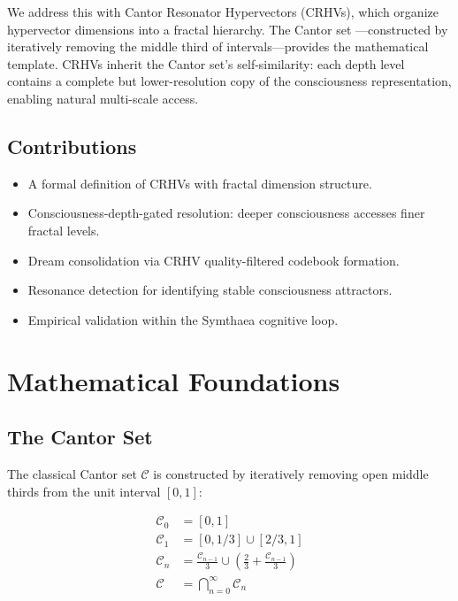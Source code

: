 \documentclass[11pt,a4paper]{article}
\begin{document}
We address this with Cantor Resonator Hypervectors (CRHVs), which organize hypervector dimensions into a fractal hierarchy. The Cantor set \citep{cantor1883}---constructed by iteratively removing the middle third of intervals---provides the mathematical template. CRHVs inherit the Cantor set's self-similarity: each depth level contains a complete but lower-resolution copy of the consciousness representation, enabling natural multi-scale access.

\subsection{Contributions}

\begin{itemize}[nosep]
    \item A formal definition of CRHVs with fractal dimension structure.
    \item Consciousness-depth-gated resolution: deeper consciousness accesses finer fractal levels.
    \item Dream consolidation via CRHV quality-filtered codebook formation.
    \item Resonance detection for identifying stable consciousness attractors.
    \item Empirical validation within the Symthaea cognitive loop.
\end{itemize}

\section{Mathematical Foundations}

\subsection{The Cantor Set}

The classical Cantor set $\mathcal{C}$ is constructed by iteratively removing open middle thirds from the unit interval $[0,1]$:

\begin{align}
\mathcal{C}_0 &= [0, 1] \\
\mathcal{C}_1 &= [0, 1/3] \cup [2/3, 1] \\
\mathcal{C}_n &= \frac{\mathcal{C}_{n-1}}{3} \cup \left(\frac{2}{3} + \frac{\mathcal{C}_{n-1}}{3}\right) \\
\mathcal{C} &= \bigcap_{n=0}^{\infty} \mathcal{C}_n
\end{align}
\end{document}
